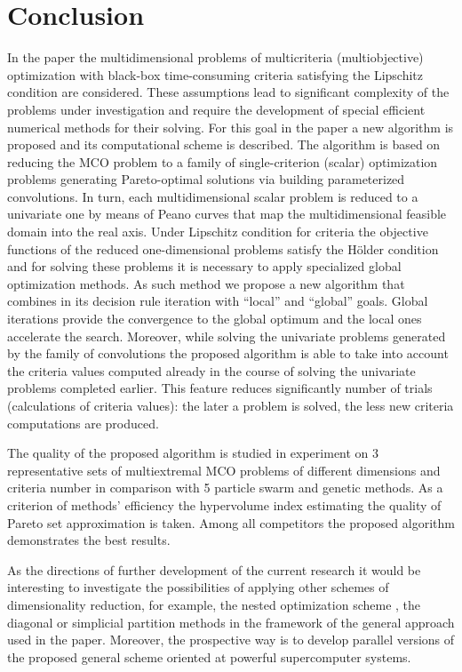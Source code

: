 \documentclass[runningheads]{llncs}
\begin{document}
\section{Conclusion}

In the paper the multidimensional problems of multicriteria (multiobjective) optimization with black-box time-consuming criteria satisfying the Lipschitz condition are considered. These assumptions lead to significant complexity of the problems under investigation and require the development of special efficient numerical methods for their solving. For this goal in the paper a new algorithm is proposed and its computational scheme is described. The algorithm is based on reducing the MCO problem to a family of single-criterion (scalar) optimization problems generating Pareto-optimal solutions via building parameterized convolutions. In turn, each multidimensional scalar problem is reduced to a univariate one by means of Peano curves that map the multidimensional feasible domain into the real axis. Under Lipschitz condition for criteria the objective functions of the reduced one-dimensional problems satisfy the H{\"o}lder condition and for solving these problems it is necessary to apply specialized global optimization methods. As such method we propose a new algorithm that combines in its decision rule iteration with ``local'' and ``global'' goals. Global iterations provide the convergence to the global optimum and the local ones accelerate the search. Moreover, while solving the univariate problems generated by the family of convolutions the proposed algorithm is able to take into account the criteria values computed already in the course of solving the univariate problems completed earlier. This feature reduces significantly number of trials (calculations of criteria values): the later a problem is solved, the less new criteria computations are produced.

The quality of the proposed algorithm is studied in experiment on 3 representative sets of multiextremal MCO problems of different dimensions and criteria number in comparison with 5 particle swarm and genetic methods. As a criterion of methods' efficiency the hypervolume index estimating the quality of Pareto set approximation is taken. Among all competitors the proposed algorithm demonstrates the best results.

As the directions of further development of the current research it would be interesting to investigate the possibilities of applying other schemes of dimensionality reduction, for example,
the nested optimization scheme \cite{Grishagin2016,Grishagin2018}, the diagonal \cite{Sergeyev2017} or simplicial \cite{PaulaviciusZilinskas2014} partition methods
in the framework of the general approach used in the paper. Moreover, the prospective way is to develop parallel versions of the proposed general scheme oriented at powerful supercomputer systems.




\end{document}
